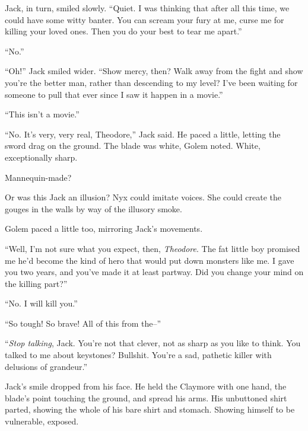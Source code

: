 Jack, in turn, smiled slowly.  ``Quiet.  I was thinking that after all this time, we could have some witty banter.  You can scream your fury at me, curse me for killing your loved ones.  Then you do your best to tear me apart.''



``No.''



``Oh!'' Jack smiled wider.  ``Show mercy, then?  Walk away from the fight and show you're the better man, rather than descending to my level?  I've been waiting for someone to pull that ever since I saw it happen in a movie.''



``This isn't a movie.''



``No.  It's very, very real, Theodore,'' Jack said.  He paced a little, letting the sword drag on the ground.  The blade was white, Golem noted.  White, exceptionally sharp.



Mannequin-made?



Or was this Jack an illusion?  Nyx could imitate voices.  She could create the gouges in the walls by way of the illusory smoke.



Golem paced a little too, mirroring Jack's movements.



``Well, I'm not sure what you expect, then, \emph{Theodore}.  The fat little boy promised me he'd become the kind of hero that would put down monsters like me.  I gave you two years, and you've made it at least partway.  Did you change your mind on the killing part?''



``No.  I will kill you.''



``So tough!  So brave!  All of this from the--''



``\emph{Stop talking}, Jack.  You're not that clever, not as sharp as you like to think.  You talked to me about keystones?  Bullshit.  You're a sad, pathetic killer with delusions of grandeur.''



Jack's smile dropped from his face.  He held the Claymore with one hand, the blade's point touching the ground, and spread his arms.  His unbuttoned shirt parted, showing the whole of his bare shirt and stomach.  Showing himself to be vulnerable, exposed.



